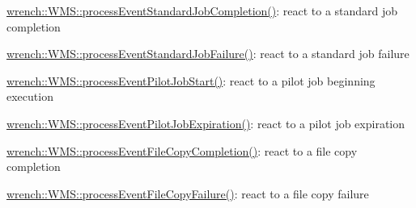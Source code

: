 \begin{DoxyItemize}
\item {\ttfamily \hyperlink{classwrench_1_1_w_m_s_aa00aeb9c502fc794efb4dbe69e800e49}{wrench\+::\+W\+M\+S\+::process\+Event\+Standard\+Job\+Completion()}}\+: react to a standard job completion
\item {\ttfamily \hyperlink{classwrench_1_1_w_m_s_a1e33e5ae8d04d96eb8e03444d78a5c52}{wrench\+::\+W\+M\+S\+::process\+Event\+Standard\+Job\+Failure()}}\+: react to a standard job failure
\item {\ttfamily \hyperlink{classwrench_1_1_w_m_s_a2044fcfb8fdd1908f50303d6faf0a2f0}{wrench\+::\+W\+M\+S\+::process\+Event\+Pilot\+Job\+Start()}}\+: react to a pilot job beginning execution
\item {\ttfamily \hyperlink{classwrench_1_1_w_m_s_ab3b8812e525c47ed3942b8d51b9b31fd}{wrench\+::\+W\+M\+S\+::process\+Event\+Pilot\+Job\+Expiration()}}\+: react to a pilot job expiration
\item {\ttfamily \hyperlink{classwrench_1_1_w_m_s_a61810ee6d81e3eb1d587da28d74bb53e}{wrench\+::\+W\+M\+S\+::process\+Event\+File\+Copy\+Completion()}}\+: react to a file copy completion
\item {\ttfamily \hyperlink{classwrench_1_1_w_m_s_a7aaff45943d82ae56e3d02626cdad6ef}{wrench\+::\+W\+M\+S\+::process\+Event\+File\+Copy\+Failure()}}\+: react to a file copy failure
\end{DoxyItemize}

